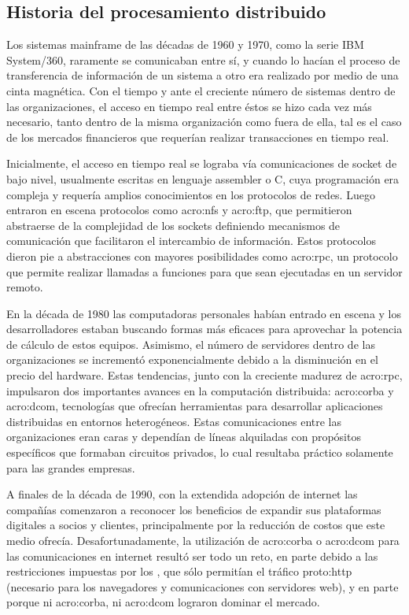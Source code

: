 \subsection{Historia del procesamiento distribuido}
\label{soa:historia}

Los sistemas mainframe de las décadas de 1960 y 1970, como la serie IBM System/360, raramente se comunicaban entre sí, y cuando lo hacían el proceso de transferencia de información de un sistema a otro era realizado por medio de una cinta magnética. Con el tiempo y ante el creciente número de sistemas dentro de las organizaciones, el acceso en tiempo real entre éstos se hizo cada vez más necesario, tanto dentro de la misma organización como fuera de ella, tal es el caso de los mercados financieros que requerían realizar transacciones en tiempo real.

Inicialmente, el acceso en tiempo real se lograba vía comunicaciones de socket de bajo nivel, usualmente escritas en lenguaje assembler o C, cuya programación era compleja y requería amplios conocimientos en los protocolos de redes. Luego entraron en escena protocolos como \gls{acro:nfs} y \gls{acro:ftp}, que permitieron abstraerse de la complejidad de los sockets definiendo mecanismos de comunicación que facilitaron el intercambio de información. Estos protocolos dieron pie a abstracciones con mayores posibilidades como \gls{acro:rpc}, un protocolo que permite realizar llamadas a funciones para que sean ejecutadas en un servidor remoto.

En la década de 1980 las computadoras personales habían entrado en escena y los desarrolladores estaban buscando formas más eficaces para aprovechar la potencia de cálculo de estos equipos. Asimismo, el número de servidores dentro de las organizaciones se incrementó exponencialmente debido a la disminución en el precio del hardware. Estas tendencias, junto con la creciente madurez de \gls{acro:rpc}, impulsaron dos importantes avances en la computación distribuida: \gls{acro:corba} y \gls{acro:dcom}, tecnologías que ofrecían herramientas para desarrollar aplicaciones distribuidas en entornos heterogéneos. Estas comunicaciones entre las organizaciones eran caras y dependían de líneas alquiladas con propósitos específicos que formaban circuitos privados, lo cual resultaba práctico solamente para las grandes empresas.

A finales de la década de 1990, con la extendida adopción de internet las compañías comenzaron a reconocer los beneficios de expandir sus plataformas digitales a socios y clientes, principalmente por la reducción de costos que este medio ofrecía. Desafortunadamente, la utilización de \gls{acro:corba} o \gls{acro:dcom} para las comunicaciones en internet resultó ser todo un reto, en parte debido a las restricciones impuestas por los , que sólo permitían el tráfico \gls{proto:http} (necesario para los navegadores y comunicaciones con servidores web), y en parte porque ni \gls{acro:corba}, ni \gls{acro:dcom} lograron dominar el mercado.

